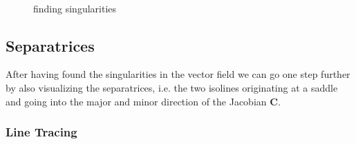 \documentclass[a4paper,10pt,notitlepage]{scrartcl}
\newcommand{\mat}[1]{\mathbf{#1}}
\begin{document}
\begin{figure}
  \centering
  \\
  \caption{finding singularities}
  \label{fig:singularities}
\end{figure}

\subsection{Separatrices}

After having found the singularities in the vector field we can go one step
further by also visualizing the separatrices, i.e. the two isolines originating
at a saddle and going into the major and minor direction of the Jacobian
$\mat{C}$.

\subsubsection{Line Tracing}
\end{document}
